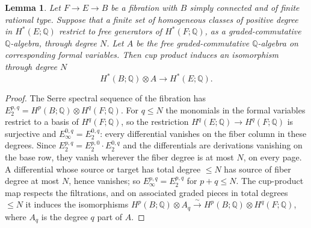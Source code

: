 \documentclass[11pt,reqno]{amsart}
\theoremstyle{plain} %
\newtheorem{lemma}[theorem]{Lemma}
\theoremstyle{definition}
\newcommand{\QQ}{\mathbb{Q}}
\begin{document}
\begin{lemma} \label{lem: Leray-Hirsch}
Let $F \to E \to B$ be a fibration with $B$ simply connected and of finite rational type. Suppose that a finite set of homogeneous classes of positive degree in $H^*(E;\QQ)$ restrict to free generators of $H^*(F;\QQ)$, as a graded-commutative $\QQ$-algebra, through degree $N$. Let $A$ be the free graded-commutative $\QQ$-algebra on corresponding formal variables. Then cup product induces an isomorphism through degree $N$
\[
H^*(B;\QQ)\otimes A\longrightarrow H^*(E;\QQ).
\]
\end{lemma}




\begin{proof}
The Serre spectral sequence of the fibration has $E_2^{p,q} = H^p(B;\QQ) \otimes H^q(F;\QQ)$. For $q \le N$ the monomials in the formal variables restrict to a basis of $H^q(F;\QQ)$, so the restriction $H^q(E;\QQ) \to H^q(F;\QQ)$ is surjective and $E_\infty^{0,q} = E_2^{0,q}$: every differential vanishes on the fiber column in these degrees. Since $E_2^{p,q} = E_2^{p,0} \cdot E_2^{0,q}$ and the differentials are derivations vanishing on the base row, they vanish wherever the fiber degree is at most $N$, on every page. A differential whose source or target has total degree $\le N$ has source of fiber degree at most $N$, hence vanishes; so $E_\infty^{p,q} = E_2^{p,q}$ for $p+q \le N$. The cup-product map respects the filtrations, and on associated graded pieces in total degrees $\le N$ it induces the isomorphisms $H^p(B;\QQ) \otimes A_q \xrightarrow{\ \sim\ } H^p(B;\QQ) \otimes H^q(F;\QQ)$, where $A_q$ is the degree $q$ part of $A$.
\end{proof}
\end{document}
